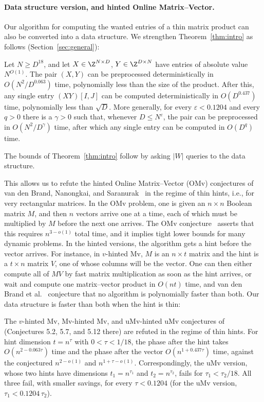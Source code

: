 \paragraph{Data structure version, and hinted Online Matrix--Vector.}
Our algorithm for computing the wanted entries of a thin matrix product can also be converted into a data structure. We strengthen Theorem~\ref{thm:intro} as follows (Section~\ref{sec:general}):

\begin{theorem}\label{thm:intro3}
Let $N\ge D^{18}$, and let $X\in\Z^{N\times D}$, $Y\in\Z^{D\times N}$ have entries of absolute value $N^{O(1)}$. The pair $(X,Y)$ can be preprocessed deterministically in $O(N^2/D^{0.063})$ time, polynomially less than the size of the product. After this, any single entry $(XY)[I,J]$ can be computed deterministically in $O(D^{0.437})$ time, polynomially less than $\sqrt D$. More generally, for every $\varepsilon<0.1204$ and every $q>0$ there is a $\gamma>0$ such that, whenever $D\le N^{\varepsilon}$, the pair can be preprocessed in $O(N^2/D^{\gamma})$ time, after which any single entry can be computed in $O(D^{q})$ time.
\end{theorem}

The bounds of Theorem~\ref{thm:intro} follow by asking $|W|$ queries to the data structure.

This allows us to refute the hinted Online Matrix--Vector (OMv) conjectures of van den Brand, Nanongkai, and Saranurak~\cite{BNS19} in the regime of thin hints, i.e., for very rectangular matrices. In the OMv problem, one is given an $n\times n$ Boolean matrix $M$, and then $n$ vectors arrive one at a time, each of which must be multiplied by $M$ before the next one arrives. The OMv conjecture~\cite{HKNS15} asserts that this requires $n^{3-o(1)}$ total time, and it implies tight lower bounds for many dynamic problems. In the hinted versions, the algorithm gets a hint before the vector arrives. For instance, in $v$-hinted Mv, $M$ is an $n\times t$ matrix and the hint is a $t\times n$ matrix $V$, one of whose columns will be the vector. One can then either compute all of $MV$ by fast matrix multiplication as soon as the hint arrives, or wait and compute one matrix--vector product in $O(nt)$ time, and van den Brand et al.~\cite{BNS19} conjecture that no algorithm is polynomially faster than both. Our data structure is faster than both when the hint is thin:

\begin{theorem}\label{thm:intro4}
The $v$-hinted Mv, Mv-hinted Mv, and uMv-hinted uMv conjectures of~\cite{BNS19} (Conjectures 5.2, 5.7, and 5.12 there) are refuted in the regime of thin hints. For hint dimension $t=n^{\tau}$ with $0<\tau<1/18$, the phase after the hint takes $O(n^{2-0.063\tau})$ time and the phase after the vector $O(n^{1+0.437\tau})$ time, against the conjectured $n^{2-o(1)}$ and $n^{1+\tau-o(1)}$. Correspondingly, the uMv version, whose two hints have dimensions $t_1=n^{\tau_1}$ and $t_2=n^{\tau_2}$, fails for $\tau_1<\tau_2/18$. All three fail, with smaller savings, for every $\tau<0.1204$ (for the uMv version, $\tau_1<0.1204\,\tau_2$).
\end{theorem}

